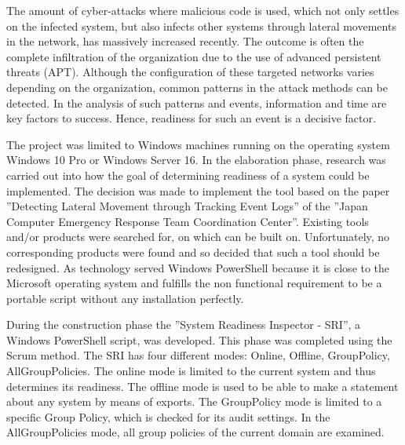 
\thispagestyle{plain}
\renewcommand\section{\stdsection}
The amount of cyber-attacks where malicious code is used, which not only settles on the infected system, but also infects other systems through lateral movements in the network, has massively increased recently. The outcome is often the complete infiltration of the organization due to the use of advanced persistent threats (APT). Although the configuration of these targeted networks varies depending on the organization, common patterns in the attack methods can be detected. In the analysis of such patterns and events, information and time are key factors to success. Hence, readiness for such an event is a decisive factor.

The project was limited to Windows machines running on the operating system Windows 10 Pro or Windows Server 16. In the elaboration phase, research was carried out into how the goal of determining readiness of a system could be implemented. The decision was made to implement the tool based on the paper ''Detecting Lateral Movement through Tracking Event Logs'' of the ''Japan Computer Emergency Response Team Coordination Center''. Existing tools and/or products were searched for, on which can be built on. Unfortunately, no corresponding products were found and so decided that such a tool should be redesigned. As technology served Windows PowerShell because it is close to the Microsoft operating system and fulfills the non functional requirement to be a portable script without any installation perfectly.


During the construction phase the ''System Readiness Inspector - SRI'', a Windows PowerShell script, was developed. This phase was completed using the Scrum method. The SRI has four different modes: Online, Offline, GroupPolicy, AllGroupPolicies. The online mode is limited to the current system and thus determines its readiness. The offline mode is used to be able to make a statement about any system by means of exports. The GroupPolicy mode is limited to a specific Group Policy, which is checked for its audit settings. In the AllGroupPolicies mode, all group policies of the current domain are examined. 
\thispagestyle{plain}